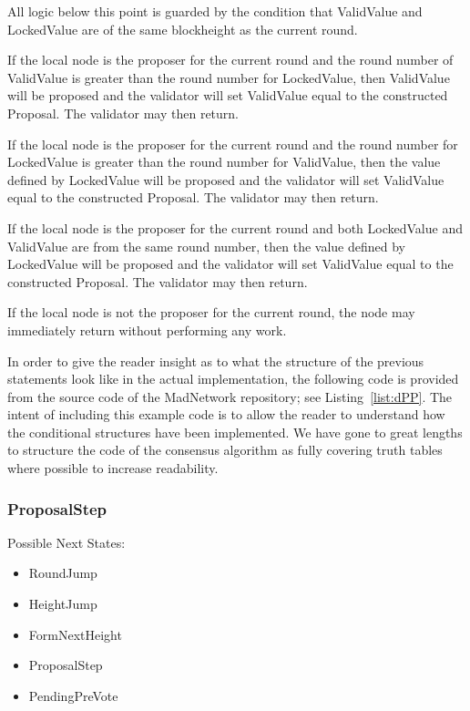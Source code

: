 All logic below this point is guarded by the condition that ValidValue
and LockedValue are of the same blockheight as the current round.

If the local node is the proposer for the current round and the round
number of ValidValue is greater than the round number for LockedValue,
then ValidValue will be proposed and the validator will set ValidValue
equal to the constructed Proposal.
The validator may then return.

If the local node is the proposer for the current round and the round
number for LockedValue is greater than the round number for ValidValue,
then the value defined by LockedValue will be proposed and the
validator will set ValidValue equal to the constructed Proposal.
The validator may then return.

If the local node is the proposer for the current round and both
LockedValue and ValidValue are from the same round number, then the
value defined by LockedValue will be proposed and the validator will
set ValidValue equal to the constructed Proposal.
The validator may then return.

If the local node is not the proposer for the current round, the node
may immediately return without performing any work.

In order to give the reader insight as to what the structure of the
previous statements look like in the actual implementation, the
following code is provided from the source code of the MadNetwork
repository; see Listing~\ref{list:dPP}.
The intent of including this example code is to allow the reader to
understand how the conditional structures have been implemented.
We have gone to great lengths to structure the code of the consensus
algorithm as fully covering truth tables where possible to increase
readability.




\subsubsection{ProposalStep}

Possible Next States:

\begin{itemize}
    \item RoundJump
    \item HeightJump
    \item FormNextHeight
    \item ProposalStep
    \item PendingPreVote
\end{itemize}

